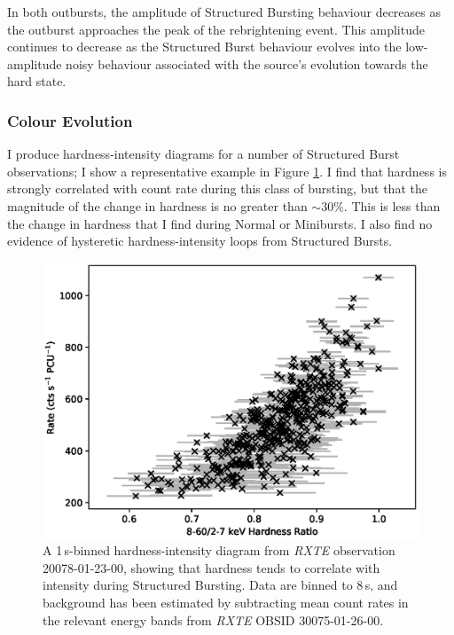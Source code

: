 \par In both outbursts, the amplitude of Structured Bursting behaviour decreases as the outburst approaches the peak of the rebrightening event.  This amplitude continues to decrease as the Structured Burst behaviour evolves into the low-amplitude noisy behaviour associated with the source's evolution towards the hard state.

\subsubsection{Colour Evolution}

\par I produce hardness-intensity diagrams for a number of Structured Burst observations; I show a representative example in Figure \ref{fig:struc_hard}.  I find that hardness is strongly correlated with count rate during this class of bursting, but that the magnitude of the change in hardness is no greater than $\sim30\%$.  This is less than the change in hardness that I find during Normal or Minibursts.  I also find no evidence of hysteretic hardness-intensity loops from Structured Bursts.

\begin{figure}
  \centering
  \includegraphics[width=.9\linewidth, trim={0.4cm 0 1.cm 0},clip]{images/struc_hard.eps}
  \caption[A hardness-intensity diagram from \textit{RXTE} observation 20078-01-23-00, showing that hardness tends to correlate with intensity during Structured Bursting.]{\small A 1\,s-binned hardness-intensity diagram from \textit{RXTE} observation 20078-01-23-00, showing that hardness tends to correlate with intensity during Structured Bursting.  Data are binned to 8\,s, and background has been estimated by subtracting mean count rates in the relevant energy bands from \textit{RXTE} OBSID 30075-01-26-00.}
  \label{fig:struc_hard}
\end{figure}

